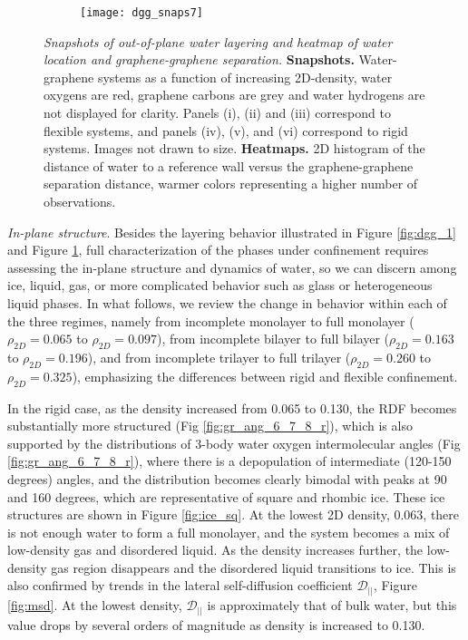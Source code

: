\documentclass[12pt]{article}
\begin{document}
\begin{figure}[ht!]
	\centering
	\begin{subfigure}[b]{0.99\textwidth}
    		\texttt{[image: dgg\_snaps7]}
  	\end{subfigure}
	\caption{\textit{Snapshots of out-of-plane water layering and heatmap of water location and graphene-graphene separation.} \textbf{Snapshots.} Water-graphene systems as a function of increasing 2D-density, water oxygens are red, graphene carbons are grey and water hydrogens are not displayed for clarity. Panels (i), (ii) and (iii) correspond to flexible systems, and panels (iv), (v), and (vi) correspond to rigid systems. Images not drawn to size. \textbf{Heatmaps.} 2D histogram of the distance of water to a reference wall versus the graphene-graphene separation distance, warmer colors representing a higher number of observations.}
	\label{fig:dgg_2}
\end{figure}


\textit{In-plane structure}. Besides the layering behavior illustrated in Figure \ref{fig:dgg_1} and Figure \ref{fig:dgg_2}, full characterization of the phases under confinement requires assessing the in-plane structure and dynamics of water, so we can discern among ice, liquid, gas, or more complicated behavior such as glass or heterogeneous liquid phases. In what follows, we review the change in behavior within each of the three regimes, namely from incomplete monolayer to full monolayer (\(\rho_{2D}=0.065\) to \(\rho_{2D}=0.097\)), from incomplete bilayer to full bilayer (\(\rho_{2D}=0.163\) to \(\rho_{2D}=0.196\)), and from incomplete trilayer to full trilayer (\(\rho_{2D}=0.260\) to \(\rho_{2D}=0.325\)), emphasizing the differences between rigid and flexible confinement.

 In the rigid case, as the density increased from 0.065 to 0.130, the RDF becomes substantially more structured (Fig \ref{fig:gr_ang_6_7_8_r}), which is also supported by the distributions of 3-body water oxygen intermolecular angles (Fig \ref{fig:gr_ang_6_7_8_r}), where there is a depopulation of intermediate (120-150 degrees) angles, and the distribution becomes clearly bimodal with peaks at 90 and 160 degrees, which are representative of square and rhombic ice. These ice structures are shown in Figure \ref{fig:ice_sq}. At the lowest 2D density, 0.063, there is not enough water to form a full monolayer, and the system becomes a mix of low-density gas and disordered liquid. As the density increases further, the low-density gas region disappears and the disordered liquid transitions to ice. This is also confirmed by trends in the lateral self-diffusion coefficient \(\mathcal{D}_{||}\), Figure \ref{fig:msd}. At the lowest density, \(\mathcal{D}_{||}\) is approximately that of bulk water, but this value drops by several orders of magnitude as density is increased to 0.130. 
\end{document}
